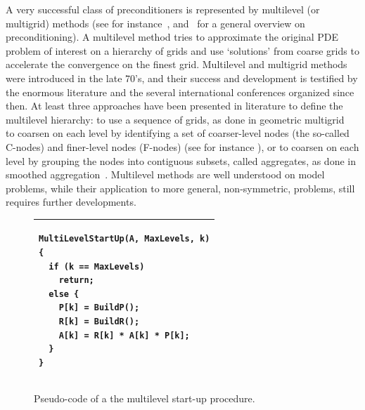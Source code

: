 \documentclass{article}[11pt]
\begin{document}
\smallskip

A very successful class of preconditioners is represented by multilevel (or
multigrid) methods 
(see for instance~\cite{brandt.classic,hack.book,hack2.book},
 and~\cite{golub97closer,vorst95parallel} for a general overview on preconditioning).
A multilevel method tries to approximate
the original PDE problem of interest on a hierarchy of grids and use
`solutions' from coarse grids to accelerate the convergence
on the finest grid.  
Multilevel and multigrid methods were introduced in the late 70's, and their
success and development is testified by the enormous literature and the several
international conferences organized since then. 
At least three
approaches have been presented in literature to define the multilevel
hierarchy:
to use a sequence of grids, as done in geometric multigrid~\cite{}
to coarsen on each level by identifying a set of coarser-level nodes
(the so-called C-nodes) and finer-level nodes (F-nodes) 
(see for instance \cite{Briggs,WHackbusch_1985a}), or 
to coarsen on each level by grouping the nodes into contiguous subsets,
called aggregates, as done in smoothed 
aggregation~\cite{brezina97robust,vanek1,vanek2,vanek3}.
Multilevel methods are well understood on model problems, while their
application to more general, non-symmetric, problems, still requires
further developments.

\smallskip


\begin{figure}
\begin{center}
\begin{tabular}{ p{12cm} }
\hline
\vspace*{0.1cm}
\hspace*{1cm}
\begin{minipage}{10cm}
\begin{verbatim}
MultiLevelStartUp(A, MaxLevels, k)
{
  if (k == MaxLevels)
    return;
  else {
    P[k] = BuildP(); 
    R[k] = BuildR();
    A[k] = R[k] * A[k] * P[k];
  }
}
\end{verbatim}
\vspace*{0.1cm}
\end{minipage} \\
\hline
\end{tabular}
\caption{Pseudo-code of a the multilevel start-up procedure.}
\label{fig:startup}
\end{center}
\end{figure}
\end{document}
